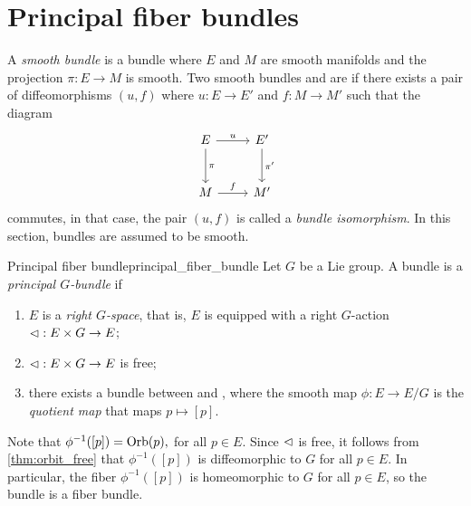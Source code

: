 \section{Principal fiber bundles}
A \emph{smooth bundle}  is a bundle where \(E\) and \(M\) are smooth manifolds and the projection \(\pi : E \to M\) is smooth. Two smooth bundles  and  are \todo[isomorphic] if there exists a pair of diffeomorphisms \((u, f)\) where \(u : E \to E'\) and \(f : M \to M'\) such that the diagram
\begin{equation*}
    \begin{tikzcd}[column sep = normal, row sep = large]
        E \arrow{r}{u} \arrow{d}{\pi} & E' \arrow{d}{\pi'}\\
        M \arrow{r}{f} & M'
    \end{tikzcd}
\end{equation*}
commutes, in that case, the pair \((u,f)\) is called a \emph{bundle isomorphism}. In this section, bundles are assumed to be smooth.

\begin{definition}{Principal fiber bundle}{principal_fiber_bundle}
    Let \(G\) be a Lie group. A bundle  is a \emph{principal \(G\)-bundle} if
    \begin{enumerate}[label=(\alph*)]
        \item \(E\) is a \emph{right \(G\)-space}, that is, \(E\) is equipped with a right \(G\)-action \(\mathbin{\vartriangleleft} : E \times G \to E\);
        \item \(\mathbin{\vartriangleleft} : E \times G \to E\) is free;
        \item there exists a bundle \todo[isomorphism] between  and , where the smooth map \(\phi : E \to E/G\) is the \emph{quotient map} that maps \(p \mapsto [p]\).
    \end{enumerate}
\end{definition}
\begin{remark}
    Note that \(\phi^{-1}([p]) = \operatorname{Orb}(p),\) for all \(p \in E\). Since \(\mathbin{\vartriangleleft}\) is free, it follows from \cref{thm:orbit_free} that \(\phi^{-1}([p])\) is diffeomorphic to \(G\) for all \(p \in E.\) In particular, the fiber \(\phi^{-1}([p])\) is homeomorphic to \(G\) for all \(p \in E\), so the bundle  is a fiber bundle.
\end{remark}

